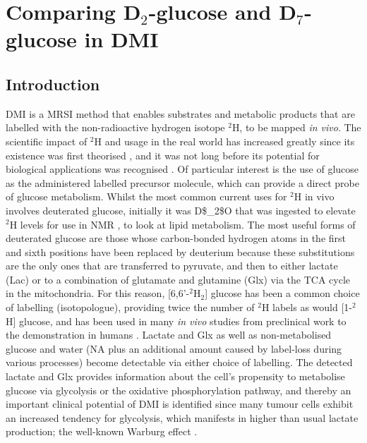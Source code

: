 \chapter{Comparing D$_2$-glucose and D$_7$-glucose in DMI}
\label{Chap:Glucose}

\section{Introduction}

\ac{DMI} is a \ac{MRSI} method that enables substrates and metabolic products that are labelled with the non-radioactive hydrogen isotope $^2$H, to be mapped \textit{in vivo}. The scientific impact of $^2$H and usage in the real world has increased greatly since its existence was first theorised \cite{Urey1932AConcentration}, and it was not long before its potential for biological applications was recognised \cite{Schoenheimer1935DeuteriumMetabolism, Schoenheimer1938TheMetabolism}. Of particular interest is the use of glucose as the administered labelled precursor molecule, which can provide a direct probe of glucose metabolism. Whilst the most common current uses for $^2$H in vivo involves deuterated glucose, initially it was \ac{D$_2$O} that was ingested to elevate $^2$H levels for use in \ac{NMR} \cite{Brereton1986PreliminarySpectroscopy, Irving1987InSpectroscopy}, to look at lipid metabolism. The most useful forms of deuterated glucose are those whose carbon-bonded hydrogen atoms in the first and sixth positions have been replaced by deuterium because these substitutions are the only ones that are transferred to pyruvate, and then to either lactate (Lac) or to a combination of glutamate and glutamine (Glx) via the \ac{TCA} cycle in the mitochondria. For this reason, [6,6'-$^2$H$_2$] glucose has been a common choice of labelling (isotopologue), providing twice the number of $^2$H labels as would [1-$^2$H] glucose, and has been used in many \textit{in vivo} studies from preclinical work \cite{Lu2017QuantitativeSpectroscopy, Meerwaldt2023InImaging} to the demonstration in humans \cite{DeFeyter2018DeuteriumVivo, Roig2022Deuterium7T}. Lactate and Glx as well as non-metabolised glucose and water (\ac{NA} plus an additional amount caused by label-loss during various processes) become detectable via either choice of labelling. The detected lactate and Glx provides information about the cell’s propensity to metabolise glucose via glycolysis or the oxidative phosphorylation pathway, and thereby an important clinical potential of DMI is identified since many tumour cells exhibit an increased tendency for glycolysis, which manifests in higher than usual lactate production;  the well-known Warburg effect \cite{Warburg1956OnCells}.    

